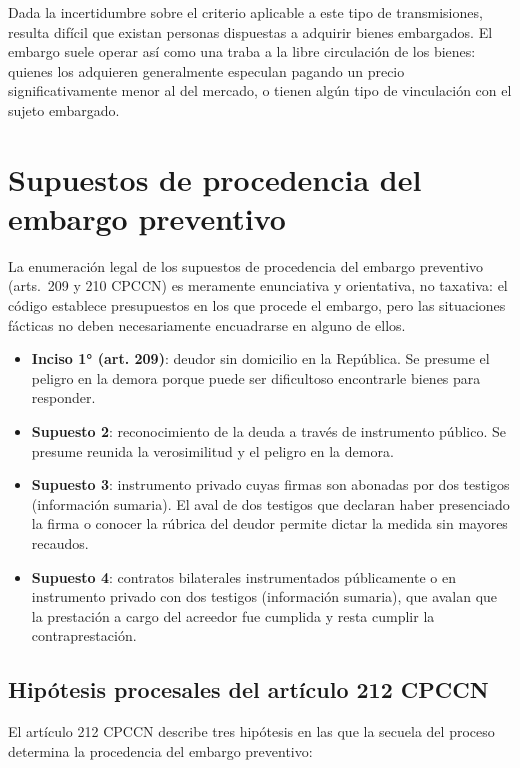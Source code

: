 \documentclass[12pt,oneside]{book}
\begin{document}
Dada la incertidumbre sobre el criterio aplicable a este tipo de transmisiones, resulta difícil que existan personas dispuestas a adquirir bienes embargados. El embargo suele operar así como una traba a la libre circulación de los bienes: quienes los adquieren generalmente especulan pagando un precio significativamente menor al del mercado, o tienen algún tipo de vinculación con el sujeto embargado.

\section{Supuestos de procedencia del embargo preventivo}

La enumeración legal de los supuestos de procedencia del embargo preventivo (arts.\ 209 y 210 CPCCN) es meramente enunciativa y orientativa, no taxativa: el código establece presupuestos en los que procede el embargo, pero las situaciones fácticas no deben necesariamente encuadrarse en alguno de ellos.

\begin{itemize}
    \item \textbf{Inciso 1° (art. 209)}: deudor sin domicilio en la República. Se presume el peligro en la demora porque puede ser dificultoso encontrarle bienes para responder.
    \item \textbf{Supuesto 2}: reconocimiento de la deuda a través de instrumento público. Se presume reunida la verosimilitud y el peligro en la demora.
    \item \textbf{Supuesto 3}: instrumento privado cuyas firmas son abonadas por dos testigos (información sumaria). El aval de dos testigos que declaran haber presenciado la firma o conocer la rúbrica del deudor permite dictar la medida sin mayores recaudos.
    \item \textbf{Supuesto 4}: contratos bilaterales instrumentados públicamente o en instrumento privado con dos testigos (información sumaria), que avalan que la prestación a cargo del acreedor fue cumplida y resta cumplir la contraprestación.
\end{itemize}

\subsection{Hipótesis procesales del artículo 212 CPCCN}

El artículo 212 CPCCN describe tres hipótesis en las que la secuela del proceso determina la procedencia del embargo preventivo:
\end{document}
